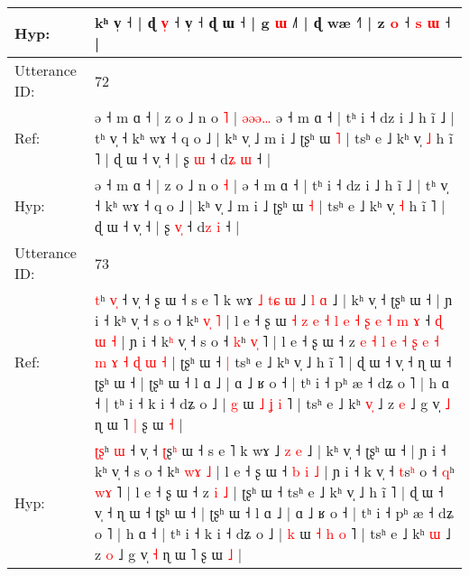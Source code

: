 \documentclass[10pt]{article}
\DeclareRobustCommand{\hl}[1]{{\textcolor{red}{#1}}}
\begin{document}
\begin{longtable}{ll}
 \\
Hyp: & kʰ v̩ ˧ | ɖ \hl{v}\hl{̩} ˧ v̩ ˧ ɖ ɯ\hl{}\hl{}\hl{}\hl{}\hl{} ˧ | g \hl{ɯ} ˩˥ | ɖ wæ ˧˥ | z \hl{o} ˧ \hl{s} \hl{ɯ} ˧ |
 \\
\midrule
Utterance ID: & 72 \\
Ref: & ə ˧ m ɑ ˧ | z o ˩ n o \hl{˥} |\hl{ }\hl{ə}\hl{ə}\hl{ə}\hl{…} ə ˧ m ɑ ˧ | tʰ i ˧ dz i ˩ h ĩ ˩ | tʰ v̩ ˧ kʰ wɤ ˧ q o ˩ | kʰ v̩ ˩ m i ˩ ʈʂʰ ɯ \hl{˥} | tsʰ e ˩ kʰ v̩ \hl{˩} h ĩ ˥ | ɖ ɯ ˧ v̩ ˧ | ʂ \hl{}\hl{ɯ} ˧ d\hl{ʑ} \hl{ɯ} ˧ |
 \\
Hyp: & ə ˧ m ɑ ˧ | z o ˩ n o \hl{˧} |\hl{}\hl{}\hl{}\hl{}\hl{} ə ˧ m ɑ ˧ | tʰ i ˧ dz i ˩ h ĩ ˩ | tʰ v̩ ˧ kʰ wɤ ˧ q o ˩ | kʰ v̩ ˩ m i ˩ ʈʂʰ ɯ \hl{˧} | tsʰ e ˩ kʰ v̩ \hl{˧} h ĩ ˥ | ɖ ɯ ˧ v̩ ˧ | ʂ \hl{v}\hl{̩} ˧ d\hl{z} \hl{i} ˧ |
 \\
\midrule
Utterance ID: & 73 \\
Ref: & \hl{}\hl{t}ʰ \hl{v}\hl{̩} ˧ v̩ ˧ \hl{}ʂ\hl{} ɯ ˧ s e ˥ k wɤ\hl{ }\hl{˩}\hl{ }\hl{t}\hl{ɕ}\hl{ }\hl{ɯ} ˩ \hl{l} \hl{ɑ} ˩ | kʰ v̩ ˧ ʈʂʰ ɯ ˧ | ɲ i ˧ kʰ v̩ ˧ s o ˧ kʰ \hl{v}\hl{̩} \hl{˥} | l e ˧ ʂ ɯ\hl{ }\hl{˧}\hl{ }\hl{z}\hl{ }\hl{e}\hl{ }\hl{˧}\hl{ }\hl{l}\hl{ }\hl{e}\hl{ }\hl{˧}\hl{ }\hl{ʂ}\hl{ }\hl{e}\hl{ }\hl{˧}\hl{ }\hl{m}\hl{ }\hl{ɤ} ˧ \hl{ɖ} \hl{ɯ} \hl{˧} | ɲ i ˧ k\hl{ʰ} v̩ ˧ \hl{}s\hl{} o ˧ \hl{k}ʰ \hl{v}\hl{̩} ˥ | l e ˧ ʂ ɯ ˧ z\hl{ }\hl{e}\hl{ }\hl{˧}\hl{ }\hl{l}\hl{ }\hl{e}\hl{ }\hl{˧}\hl{ }\hl{ʂ}\hl{ }\hl{e}\hl{ }\hl{˧}\hl{ }\hl{m}\hl{ }\hl{ɤ}\hl{ }\hl{˧}\hl{ }\hl{ɖ} \hl{ɯ} \hl{˧} | ʈʂʰ ɯ ˧\hl{ }\hl{|} tsʰ e ˩ kʰ v̩ ˩ h ĩ ˥ | ɖ ɯ ˧ v̩ ˧ ɳ ɯ ˧ ʈʂʰ ɯ ˧ | ʈʂʰ ɯ ˧ l ɑ ˩ | ɑ ˩ ʁ o ˧ | tʰ i ˧ pʰ æ ˧ dʑ o ˥ | h ɑ ˧ | tʰ i ˧ k i ˧ dʑ o ˩ | \hl{g} ɯ \hl{˩} \hl{ʝ} \hl{i} ˥ | tsʰ e ˩ kʰ \hl{v}\hl{̩} ˩ z \hl{e} ˩ g v̩ \hl{˩} ɳ ɯ ˥\hl{ }\hl{|} ʂ ɯ \hl{˧} |
 \\
Hyp: & \hl{ʈ}\hl{ʂ}ʰ \hl{}\hl{ɯ} ˧ v̩ ˧ \hl{ʈ}ʂ\hl{ʰ} ɯ ˧ s e ˥ k wɤ\hl{}\hl{}\hl{}\hl{}\hl{}\hl{}\hl{} ˩ \hl{z} \hl{e} ˩ | kʰ v̩ ˧ ʈʂʰ ɯ ˧ | ɲ i ˧ kʰ v̩ ˧ s o ˧ kʰ \hl{w}\hl{ɤ} \hl{˩} | l e ˧ ʂ ɯ\hl{}\hl{}\hl{}\hl{}\hl{}\hl{}\hl{}\hl{}\hl{}\hl{}\hl{}\hl{}\hl{}\hl{}\hl{}\hl{}\hl{}\hl{}\hl{}\hl{}\hl{}\hl{}\hl{}\hl{} ˧ \hl{b} \hl{i} \hl{˩} | ɲ i ˧ k\hl{} v̩ ˧ \hl{t}s\hl{ʰ} o ˧ \hl{q}ʰ \hl{w}\hl{ɤ} ˥ | l e ˧ ʂ ɯ ˧ z\hl{}\hl{}\hl{}\hl{}\hl{}\hl{}\hl{}\hl{}\hl{}\hl{}\hl{}\hl{}\hl{}\hl{}\hl{}\hl{}\hl{}\hl{}\hl{}\hl{}\hl{}\hl{}\hl{}\hl{} \hl{i} \hl{˩} | ʈʂʰ ɯ ˧\hl{}\hl{} tsʰ e ˩ kʰ v̩ ˩ h ĩ ˥ | ɖ ɯ ˧ v̩ ˧ ɳ ɯ ˧ ʈʂʰ ɯ ˧ | ʈʂʰ ɯ ˧ l ɑ ˩ | ɑ ˩ ʁ o ˧ | tʰ i ˧ pʰ æ ˧ dʑ o ˥ | h ɑ ˧ | tʰ i ˧ k i ˧ dʑ o ˩ | \hl{k} ɯ \hl{˧} \hl{h} \hl{o} ˥ | tsʰ e ˩ kʰ \hl{}\hl{ɯ} ˩ z \hl{o} ˩ g v̩ \hl{˧} ɳ ɯ ˥\hl{}\hl{} ʂ ɯ \hl{˩} |

\end{longtable}
\end{document}

